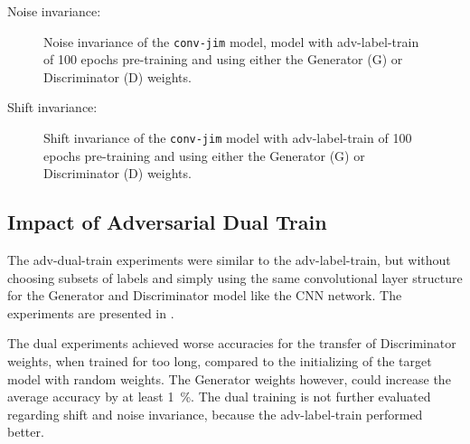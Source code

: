Noise invariance:
\begin{figure}[!ht]
  \centering
  \caption{Noise invariance of the \texttt{conv-jim} model,  model with adv-label-train of 100 epochs pre-training and using either the Generator (G) or Discriminator (D) weights.}
  \label{fig:exp_adv_label_tb_noise_conv-jim}
\end{figure}
\FloatBarrier
\noindent

Shift invariance:
\begin{figure}[!ht]
  \centering
  \caption{Shift invariance of the \texttt{conv-jim} model with adv-label-train of 100 epochs pre-training and using either the Generator (G) or Discriminator (D) weights.}
  \label{fig:exp_adv_label_tb_shift_conv-jim}
\end{figure}
\FloatBarrier
\noindent



\subsection{Impact of Adversarial Dual Train}
The adv-dual-train experiments were similar to the adv-label-train, but without choosing subsets of labels and simply using the same convolutional layer structure for the Generator and Discriminator model like the CNN network.
The experiments are presented in .

The dual experiments achieved worse accuracies for the transfer of Discriminator weights, when trained for too long, compared to the initializing of the target model with random weights.
The Generator weights however, could increase the average accuracy by at least \SI{1}{\percent}.
The dual training is not further evaluated regarding shift and noise invariance, because the adv-label-train performed better.

